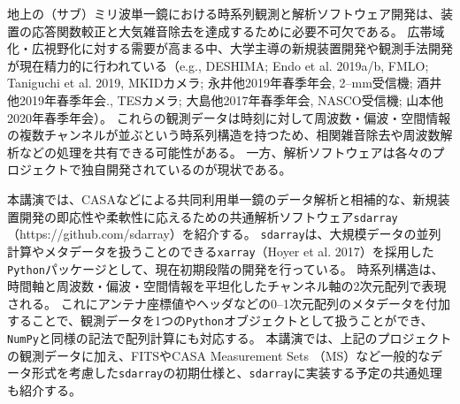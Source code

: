 \documentclass[ja]{2020a}
\begin{document}

地上の（サブ）ミリ波単一鏡における時系列観測と解析ソフトウェア開発は、装置の応答関数較正と大気雑音除去を達成するために必要不可欠である。
広帯域化・広視野化に対する需要が高まる中、大学主導の新規装置開発や観測手法開発が現在精力的に行われている（e.g., DESHIMA; Endo et al. 2019a/b, FMLO; Taniguchi et al. 2019, MKIDカメラ; 永井他2019年春季年会, 2--mm受信機; 酒井他2019年春季年会., TESカメラ; 大島他2017年春季年会, NASCO受信機; 山本他2020年春季年会）。
これらの観測データは時刻に対して周波数・偏波・空間情報の複数チャンネルが並ぶという時系列構造を持つため、相関雑音除去や周波数解析などの処理を共有できる可能性がある。
一方、解析ソフトウェアは各々のプロジェクトで独自開発されているのが現状である。

本講演では、CASAなどによる共同利用単一鏡のデータ解析と相補的な、新規装置開発の即応性や柔軟性に応えるための共通解析ソフトウェア\texttt{sdarray}（https://github.com/sdarray）を紹介する。
\texttt{sdarray}は、大規模データの並列計算やメタデータを扱うことのできる\texttt{xarray}（Hoyer et al. 2017）を採用した\texttt{Python}パッケージとして、現在初期段階の開発を行っている。
時系列構造は、時間軸と周波数・偏波・空間情報を平坦化したチャンネル軸の2次元配列で表現される。
これにアンテナ座標値やヘッダなどの0--1次元配列のメタデータを付加することで、観測データを1つの\texttt{Python}オブジェクトとして扱うことができ、\texttt{NumPy}と同様の記法で配列計算にも対応する。
本講演では、上記のプロジェクトの観測データに加え、FITSやCASA Measurement Sets （MS）など一般的なデータ形式を考慮した\texttt{sdarray}の初期仕様と、\texttt{sdarray}に実装する予定の共通処理も紹介する。

\end{document}
